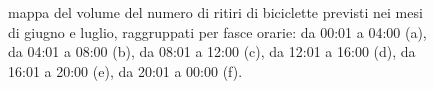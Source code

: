 \begin{figure}[htpb]
	\quad
	\caption[Mappa del volume del numero di ritiri di biciclette previsti nei mesi di giugno e luglio raggruppati per fasce orarie]{mappa del volume del numero di ritiri di biciclette previsti nei mesi di giugno e luglio, raggruppati per fasce orarie: da 00:01 a 04:00 (a), da 04:01 a 08:00 (b), da 08:01 a 12:00 (c), da 12:01 a 16:00 (d), da 16:01 a 20:00 (e), da 20:01 a 00:00 (f).}
	\label{Krignig_giugno_e_lugio}
\end{figure}
